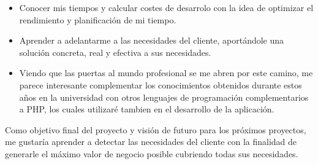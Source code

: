 \begin{itemize}
	\item Conocer mis tiempos y calcular costes de desarrolo con la idea de optimizar el rendimiento y planificación de mi tiempo.
	
	\item Aprender a adelantarme a las necesidades del cliente, aportándole una solución concreta, real y efectiva a sus necesidades.
	
	\item Viendo que las puertas al mundo profesional se me abren por este camino, me parece interesante complementar los conocimientos obtenidos durante estos años en la universidad con otros lenguajes de programación complementarios a PHP, los cuales utilizaré tambien en el desarrollo de la aplicación.
\end{itemize}

Como objetivo final del proyecto y visión de futuro para los próximos proyectos, me gustaría aprender a detectar las necesidades del cliente con la finalidad de generarle el máximo valor de negocio posible cubriendo todas sus necesidades.
